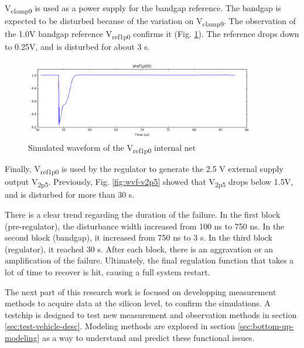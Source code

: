 V\textsubscript{clamp9} is used as a power supply for the bandgap reference.
The bandgap is expected to be disturbed because of the variation on V\textsubscript{clamp9}.
The observation of the 1.0V bandgap reference V\textsubscript{ref1p0} confirms it (Fig. \ref{fig:wvf-v1p0}).
The reference drops down to 0.25V, and is disturbed for about 3 \textmugreek{}s.

\begin{figure}[!h]
  \centering
  \includegraphics[width=0.9\textwidth]{src/3/figures/v1p0.png}
  \caption{Simulated waveform of the V\textsubscript{ref1p0} internal net}
  \label{fig:wvf-v1p0}
\end{figure}

Finally, V\textsubscript{ref1p0} is used by the regulator to generate the 2.5 V external supply output V\textsubscript{2p5}.
Previously,  Fig. \ref{fig:wvf-v2p5} showed that V\textsubscript{2p5} drops below 1.5V, and is disturbed for more than 30 \textmugreek{}s.

There is a clear trend regarding the duration of the failure.
In the first block (pre-regulator), the disturbance width increased from 100 ns to 750 ns.
In the second block (bandgap), it increased from 750 ns to 3 \textmugreek{}s.
In the third block (regulator), it reached 30 \textmugreek{}s.
After each block, there is an aggravation or an amplification of the failure.
Ultimately, the final regulation function that takes a lot of time to recover is hit, causing a full system restart.

The next part of this research work is focused on developping measurement methods to acquire data at the silicon level, to confirm the simulations.
A testchip is designed to test new measurement and observation methods in section \ref{sec:test-vehicle-desc}.
Modeling methods are explored in section \ref{sec:bottom-up-modeling} as a way to understand and predict these functional issues.
